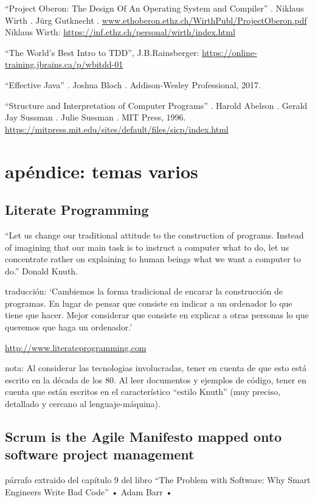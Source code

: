\documentclass[spanish,12pt,a4paper,final,oneside]{book}
\begin{document}
``Project Oberon: The Design Of An Operating System and Compiler'' . Niklaus Wirth . Jürg Gutknecht . \url{www.ethoberon.ethz.ch/WirthPubl/ProjectOberon.pdf}
Niklaus Wirth: \url{https://inf.ethz.ch/personal/wirth/index.html}

``The World’s Best Intro to TDD'', J.B.Rainsberger: \url{https://online-training.jbrains.ca/p/wbitdd-01}

``Effective Java'' . Joshua Bloch . Addison-Wesley Professional, 2017.

``Structure and Interpretation of Computer Programs'' . Harold Abelson . Gerald Jay Sussman . Julie Sussman . MIT Press, 1996.
\url{https://mitpress.mit.edu/sites/default/files/sicp/index.html}

\chapter*{apéndice: temas varios}

\section*{Literate Programming}
``Let us change our traditional attitude to the construction of programs. Instead of imagining that our main task is to instruct a computer what to do, let us concentrate rather on explaining to human beings what we want a computer to do.''
Donald Knuth.

traducción: ‘Cambiemos la forma tradicional de encarar la construcción de programas. En lugar de pensar que consiste en indicar a un ordenador lo que tiene que hacer. Mejor considerar que consiste en explicar a otras personas lo que queremos que haga un ordenador.’

\url{http://www.literateprogramming.com} 

nota: Al considerar las tecnologias involucradas, tener en cuenta de que esto está escrito en la década de los 80. Al leer documentos y ejemplos de código, tener en cuenta que están escritos en el característico ``estilo Knuth'' (muy preciso, detallado y cercano al lenguaje-máquina).

\section*{Scrum is the Agile Manifesto mapped onto software project management}
párrafo extraido del capítulo 9 del libro ``The Problem with Software: Why Smart Engineers Write Bad Code'' • Adam Barr • 
\end{document}
